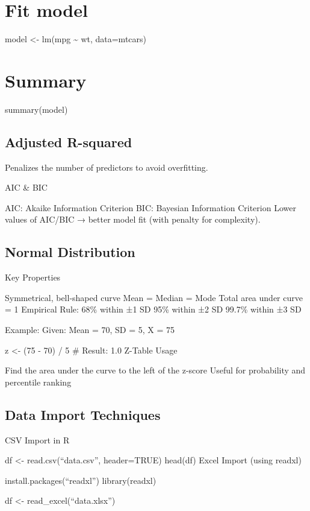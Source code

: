\documentclass[
  letterpaper,
  DIV=11,
  numbers=noendperiod]{scrreprt}
\begin{document}
\section{Fit model}\label{fit-model}

model \textless- lm(mpg \textasciitilde{} wt, data=mtcars)

\section{Summary}\label{summary}

summary(model)

\subsection{Adjusted R-squared}\label{adjusted-r-squared}

Penalizes the number of predictors to avoid overfitting.

AIC \& BIC

AIC: Akaike Information Criterion BIC: Bayesian Information Criterion
Lower values of AIC/BIC → better model fit (with penalty for
complexity).

\subsection{Normal Distribution}\label{normal-distribution-1}

Key Properties

Symmetrical, bell-shaped curve Mean = Median = Mode Total area under
curve = 1 Empirical Rule: 68\% within ±1 SD 95\% within ±2 SD 99.7\%
within ±3 SD

Example: Given: Mean = 70, SD = 5, X = 75

z \textless- (75 - 70) / 5 \# Result: 1.0 Z-Table Usage

Find the area under the curve to the left of the z-score Useful for
probability and percentile ranking

\subsection{Data Import Techniques}\label{data-import-techniques}

CSV Import in R

df \textless- read.csv(``data.csv'', header=TRUE) head(df) Excel Import
(using readxl)

install.packages(``readxl'') library(readxl)

df \textless- read\_excel(``data.xlsx'')
\end{document}
